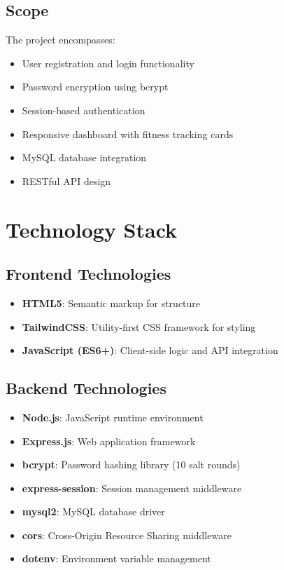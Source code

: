 \documentclass[12pt,a4paper]{article}
\begin{document}
\subsection{Scope}
The project encompasses:
\begin{itemize}
    \item User registration and login functionality
    \item Password encryption using bcrypt
    \item Session-based authentication
    \item Responsive dashboard with fitness tracking cards
    \item MySQL database integration
    \item RESTful API design
\end{itemize}

\section{Technology Stack}

\subsection{Frontend Technologies}
\begin{itemize}
    \item \textbf{HTML5}: Semantic markup for structure
    \item \textbf{TailwindCSS}: Utility-first CSS framework for styling
    \item \textbf{JavaScript (ES6+)}: Client-side logic and API integration
\end{itemize}

\subsection{Backend Technologies}
\begin{itemize}
    \item \textbf{Node.js}: JavaScript runtime environment
    \item \textbf{Express.js}: Web application framework
    \item \textbf{bcrypt}: Password hashing library (10 salt rounds)
    \item \textbf{express-session}: Session management middleware
    \item \textbf{mysql2}: MySQL database driver
    \item \textbf{cors}: Cross-Origin Resource Sharing middleware
    \item \textbf{dotenv}: Environment variable management
\end{itemize}
\end{document}
